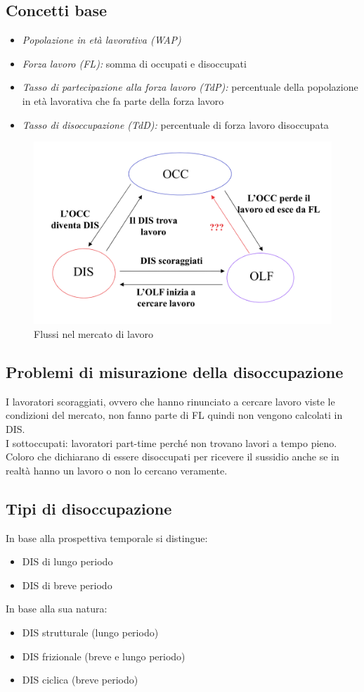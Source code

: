 \documentclass{report}
\begin{document}
	\subsection{Concetti base}
	\begin{itemize}
		\item \textit{Popolazione in età lavorativa (WAP)}
		\item \textit{Forza lavoro (FL):} somma di occupati e disoccupati
		\item \textit{Tasso di partecipazione alla forza lavoro (TdP):} percentuale della popolazione in età lavorativa che fa parte della forza lavoro
		\item \textit{Tasso di disoccupazione (TdD):} percentuale di forza lavoro disoccupata
	\end{itemize}
	\begin{figure}[h]
		\centering
		\includegraphics[width=0.7\linewidth]{images/flussi-mercato-lavoro}
		\caption{Flussi nel mercato di lavoro}
		\label{fig:flussi-mercato-lavoro}
	\end{figure}
	\subsection{Problemi di misurazione della disoccupazione}
	I lavoratori scoraggiati, ovvero che hanno rinunciato a cercare lavoro viste le condizioni del mercato, non fanno parte di FL quindi non vengono calcolati in DIS.
	\medskip \\I sottoccupati: lavoratori part-time perché non trovano lavori a tempo pieno.
	\medskip \\Coloro che dichiarano di essere disoccupati per ricevere il sussidio anche se in realtà hanno un lavoro o non lo cercano veramente.
	\subsection{Tipi di disoccupazione}
	In base alla prospettiva temporale si distingue:
	\begin{itemize}
		\item DIS di lungo periodo
		\item DIS di breve periodo
	\end{itemize}
	In base alla sua natura:
	\begin{itemize}
		\item DIS strutturale (lungo periodo)
		\item DIS frizionale (breve e lungo periodo)
		\item DIS ciclica (breve periodo)
	\end{itemize}
\end{document}
